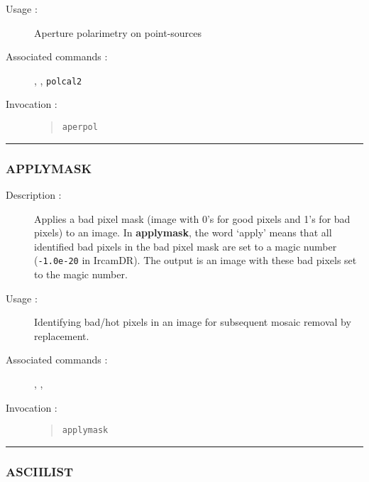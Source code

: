 \begin{description}
\item[Usage :] Aperture polarimetry on point-sources

\item[Associated commands :] {\tt {}}, 
{\tt {}}, {\tt {}} 
{\tt polcal2}

\item[Invocation :]

\begin{quote}{\tt  aperpol }\end{quote}

\end{description}

\hrule 
\subsubsection*{\label{APPLYMASK}APPLYMASK}

\begin{description}

\item[Description :] Applies a bad pixel mask (image with 0's for good
pixels and 1's for bad pixels) to an image.  In {\bf applymask}, the word
`apply' means that all identified bad pixels in the bad pixel mask are
set to a magic number ({\tt -1.0e-20} in {\sc IrcamDR}).  The output is
an image with these bad pixels set to the magic number.

\item[Usage :] Identifying bad/hot pixels in an image for subsequent mosaic
removal by replacement.

\item[Associated commands :] {\tt {}}, 
{\tt {}}, {\tt {}}

\item[Invocation :]

\begin{quote}{\tt  applymask }\end{quote}

\end{description}

\hrule 
\subsubsection*{\label{ASCIILIST}ASCIILIST}


